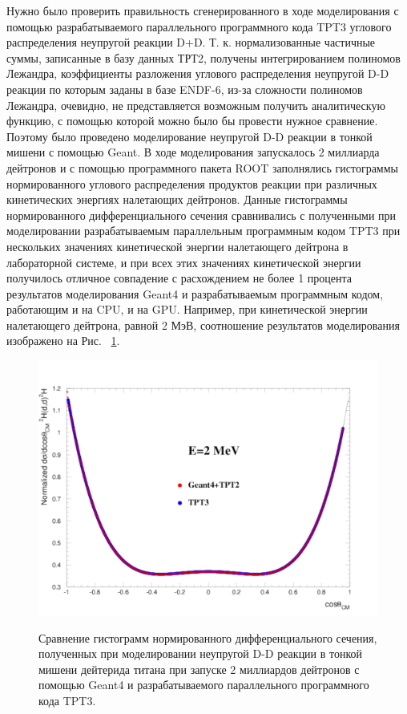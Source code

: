\documentclass[a4paper,12pt]{article}
\begin{document}
\begin{large}
	Нужно было проверить правильность сгенерированного в ходе моделирования с помощью разрабатываемого параллельного программного кода TPT3 углового распределения неупругой реакции D+D.
	Т. к. нормализованные частичные суммы, записанные в базу данных ТРТ2, получены интегрированием полиномов Лежандра, коэффициенты разложения углового распределения неупругой D-D реакции по которым заданы в базе ENDF-6, из-за сложности полиномов Лежандра, очевидно, не представляется возможным получить аналитическую функцию, с помощью которой можно было бы провести нужное сравнение.
	Поэтому было проведено моделирование неупругой D-D реакции в тонкой мишени с помощью Geant.
	В ходе моделирования запускалось 2 миллиарда дейтронов и с помощью программного пакета ROOT заполнялись гистограммы нормированного углового распределения продуктов реакции при различных кинетических энергиях налетающих дейтронов.
	Данные гистограммы нормированного дифференциального сечения сравнивались с полученными при моделировании разрабатываемым параллельным программным кодом TPT3 при нескольких значениях кинетической энергии налетающего дейтрона в лабораторной системе, и при всех этих значениях кинетической энергии получилось отличное совпадение с расхождением не более 1 процента результатов моделирования Geant4 и разрабатываемым программным кодом, работающим и на CPU, и на GPU.
	Например, при кинетической энергии налетающего дейтрона, равной 2 МэВ, соотношение результатов моделирования изображено на  Рис. ~\ref{fig:ValidationThermonuclear2mev2billionParticles}.
	
\begin{figure}[ht]
  {
     \includegraphics[width=0.99\linewidth]{images/validation_thermonuclear_2mev_2billion.pdf}
  }
  \caption{Сравнение гистограмм нормированного дифференциального сечения, полученных при моделировании неупругой D-D реакции в тонкой мишени дейтерида титана при запуске 2 миллиардов дейтронов с помощью Geant4 и разрабатываемого параллельного программного кода TPT3.}
  \label{fig:ValidationThermonuclear2mev2billionParticles}
\end{figure}	
	

\end{large}
\end{document}
